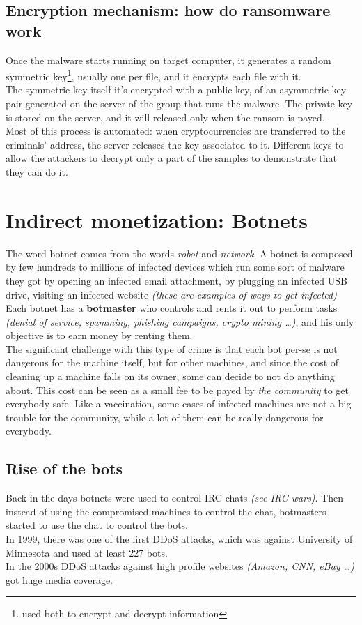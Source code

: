     \subsection{Encryption mechanism: how do ransomware work}
        Once the malware starts running on target computer, it generates a random symmetric key\footnote{used both to encrypt and decrypt information}, usually one per file, and it encrypts each file with it.\\
        The symmetric key itself it's encrypted with a public key, of an asymmetric key pair generated on the server of the group that runs the malware. The private key is stored on the server, and it will released only when the ransom is payed.\\
        Most of this process is automated: when cryptocurrencies are transferred to the criminals' address, the server releases the key associated to it.
        Different keys to allow the attackers to decrypt only a part of the samples to demonstrate that they can do it.
\section{Indirect monetization: Botnets}
    The word botnet comes from the words \textit{robot} and \textit{network}. A botnet is composed by few hundreds to millions of infected devices which run some sort of malware they got by opening an infected email attachment, by plugging an infected USB drive, visiting an infected website \textit{(these are examples of ways to get infected)}\\
    Each botnet has a \textbf{botmaster} who controls and rents it out to perform tasks \textit{(denial of service, spamming, phishing campaigns, crypto mining \dots)}, and his only objective is to earn money by renting them.\\
    The significant challenge with this type of crime is that each bot per-se is not dangerous for the machine itself, but for other machines, and since the cost of cleaning up a machine falls on its owner, some can decide to not do anything about. This cost can be seen as a small fee to be payed by \textit{the community} to get everybody safe. Like a vaccination, some cases of infected machines are not a big trouble for the community, while a lot of them can be really dangerous for everybody.
    \subsection{Rise of the bots}
        Back in the days botnets were used to control IRC chats \textit{(see IRC wars)}. Then instead of using the compromised machines to control the chat, botmasters started to use the chat to control the bots.\\
        In 1999, there was one of the first DDoS attacks, which was against University of Minnesota and used at least 227 bots.\\
        In the 2000s DDoS attacks against high profile websites \textit{(Amazon, CNN, eBay \dots)} got huge media coverage.
\newpage
